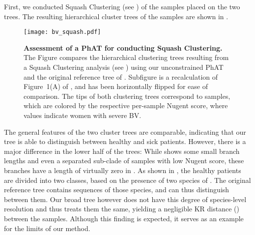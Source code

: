 First, we conducted Squash Clustering \citep{Matsen2011a}
(see )
of the samples placed on the two trees.
The resulting hierarchical cluster trees of the samples are shown in .

\begin{figure}[hpbt]
    \centering
    \texttt{[image: bv\_squash.pdf]}
    \begin{subfigure}{0pt}
        \label{fig:bv_squash:sub:squash_art}
    \end{subfigure}
    \begin{subfigure}{0pt}
        \label{fig:bv_squash:sub:squash_orig}
    \end{subfigure}
    \caption[Assessment of a \acs{PhAT} for conducting Squash Clustering]{
        \textbf{Assessment of a \acs{PhAT} for conducting Squash Clustering.}
        The Figure compares the hierarchical clustering trees resulting from a Squash Clustering analysis
        (see )
        using   our unconstrained  \acs{PhAT} and
         the original reference tree of .
        Subfigure  is a recalculation of Figure~1(A) of \cite{Srinivasan2012},
        and has been horizontally flipped for ease of comparison.
        The tips of both clustering trees correspond to samples,
        which are colored by the respective per-sample Nugent score,
        where values indicate women with severe \acl{BV}.
    }
    \label{fig:bv_squash}
\end{figure}

The general features of the two cluster trees are comparable,
indicating that our tree is able to distinguish between healthy and sick patients.
However, there is a major difference in the lower half of the trees:
While  shows some small branch lengths and even a separated sub-clade
of samples with low Nugent score,
these branches have a length of virtually zero in .
As shown in \citep{Srinivasan2012}, the healthy patients are divided into two classes,
based on the presence of two species of .
The original reference tree contains sequences of those species, and can thus distinguish between them.
Our broad  tree however
does not have this degree of species-level resolution and thus treats them the same,
yielding a negligible KR distance ()
between the samples.
Although this finding is expected, it serves as an example for the limits of our method.

